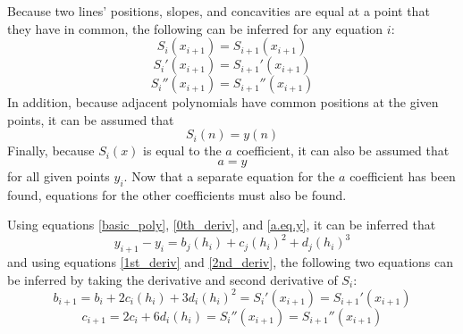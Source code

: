 \documentclass[12pt, letterpaper]{article} %
\begin{document}
Because two lines' positions, slopes, and concavities are equal at a point that they have in common, the following can be inferred for any equation \(i\):
\begin{equation}
S_i(x_{i+1}) = S_{i+1}(x_{i+1})
\label{0th_deriv}
\end{equation}
\begin{equation}
S_i'(x_{i+1}) = S_{i+1}'(x_{i+1})
\label{1st_deriv}
\end{equation}
\begin{equation}
S_i''(x_{i+1}) = S_{i+1}''(x_{i+1})
\label{2nd_deriv}
\end{equation}
In addition, because adjacent polynomials have common positions at the given points, it can be assumed that
\begin{equation}
S_i(n) = y(n)
\label{si.eq.y}
\end{equation}
Finally, because \(S_i(x)\) is equal to the \(a\) coefficient, it can also be assumed that
\begin{equation}
a = y
\label{a.eq.y}
\end{equation}
for all given points \(y_i\). Now that a separate equation for the $a$ coefficient has been found, equations for the other coefficients must also be found. 

Using equations \ref{basic_poly}, \ref{0th_deriv}, and \ref{a.eq.y}, it can be inferred that
\begin{equation}
y_{i + 1} - y_i =  b_j(h_i) + c_j(h_i)^2 + d_j(h_i)^3
\label{d_1st}
\end{equation}
and using equations \ref{1st_deriv} and \ref{2nd_deriv}, the following two equations can be inferred by taking the derivative and second derivative of \(S_i\):
\begin{equation}
b_{i + 1} = b_i + 2c_i(h_i) + 3d_i(h_i)^2 = S_i'(x_{i + 1}) = S_{i + 1}'(x_{i + 1})
\label{1st_deriv_appl}
\end{equation}
\begin{equation}
c_{i + 1} = 2c_i + 6d_i(h_i) = S_i''(x_{i + 1}) = S_{i + 1}''(x_{i + 1})
\label{2nd_deriv_appl}
\end{equation}
\end{document}
